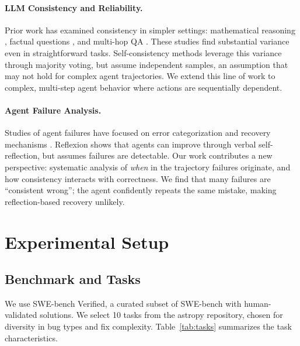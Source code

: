 \documentclass{article}
\begin{document}
\paragraph{LLM Consistency and Reliability.} Prior work has examined consistency in simpler settings: mathematical reasoning \citep{wang2023selfconsistency}, factual questions \citep{elazar2021consistency}, and multi-hop QA \citep{mehta2026agents}. These studies find substantial variance even in straightforward tasks. Self-consistency methods \citep{wang2023selfconsistency} leverage this variance through majority voting, but assume independent samples, an assumption that may not hold for complex agent trajectories. We extend this line of work to complex, multi-step agent behavior where actions are sequentially dependent.

\paragraph{Agent Failure Analysis.} Studies of agent failures have focused on error categorization \citep{agent_errors} and recovery mechanisms \citep{reflexion}. Reflexion \citep{reflexion} shows that agents can improve through verbal self-reflection, but assumes failures are detectable. Our work contributes a new perspective: systematic analysis of \textit{when} in the trajectory failures originate, and how consistency interacts with correctness. We find that many failures are ``consistent wrong''; the agent confidently repeats the same mistake, making reflection-based recovery unlikely.

\section{Experimental Setup}
\label{sec:setup}

\subsection{Benchmark and Tasks}

We use SWE-bench Verified, a curated subset of SWE-bench with human-validated solutions. We select 10 tasks from the astropy repository, chosen for diversity in bug types and fix complexity. Table~\ref{tab:tasks} summarizes the task characteristics.
\end{document}
